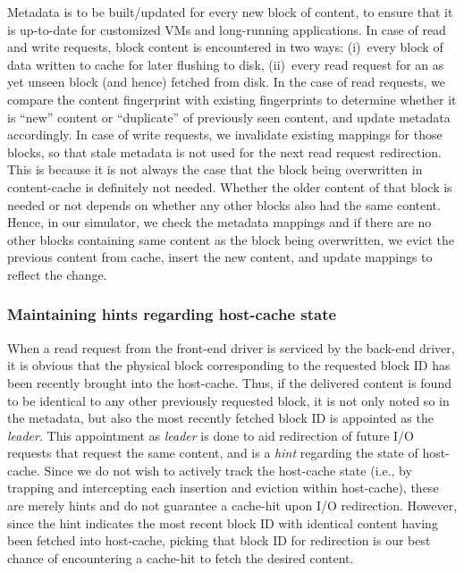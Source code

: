 Metadata is to be built/updated for every new block of content, to ensure that
it is up-to-date for customized VMs and long-running applications.
In case of read and write requests, block content is encountered in two ways:
(i)~every block of data written to cache for later flushing to disk,
(ii)~every read request for an as yet unseen block (and hence) fetched
from disk. 
In the case of read requests, we compare the 
content fingerprint
with existing fingerprints to determine
whether it is ``new'' content or ``duplicate'' of previously seen content,
and update metadata accordingly.
In case of write requests, we invalidate existing mappings for those blocks,
so that stale metadata is not used for the next read request redirection.
This is because it is not always the case that the block being overwritten 
in content-cache is definitely not needed. Whether the older content of 
that block is needed or not depends on whether any other blocks also had 
the same content. Hence, in our simulator, we check the metadata mappings 
and if there are no other blocks containing same content as the block 
being overwritten, we evict the previous content from cache, insert the 
new content, and update mappings to reflect the change. 

\subsubsection{Maintaining hints regarding host-cache state}
When a read request from the front-end driver is serviced by the back-end
driver, it is obvious that the physical block
corresponding to the requested
block ID has been recently brought into the host-cache. Thus, if the delivered
content is found to be identical to any other previously requested block, it 
is not only noted 
so in the metadata, but also the most recently fetched block ID is appointed
as the \textit{leader}. This appointment as \textit{leader} is done to aid
redirection of future I/O requests that request the same content, and is
a \textit{hint} regarding the state of host-cache.
Since we do not wish to actively track the host-cache state (i.e., by
trapping and intercepting each insertion and eviction within host-cache), 
these are merely hints and do not guarantee a cache-hit upon I/O redirection.
However, since the hint indicates the most recent block ID with identical
content having been fetched into host-cache, picking that block ID for 
redirection is our best chance of encountering a cache-hit to fetch the 
desired content. 


